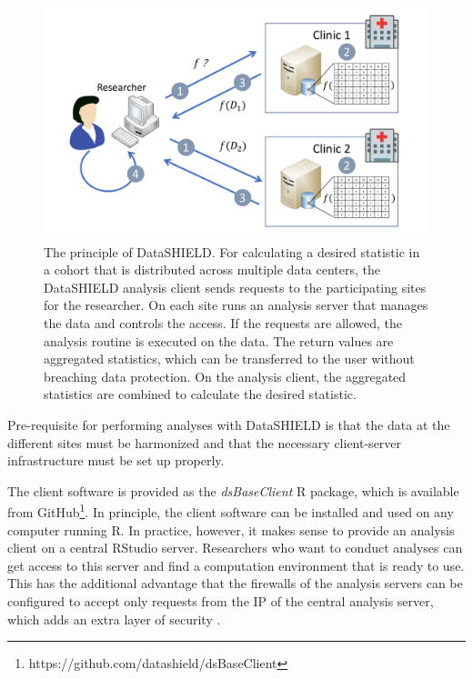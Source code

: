 \documentclass[12pt]{article}
\newcommand{\apkg}[1]{\emph{#1}}
\newcommand{\circlenum}[1]{\raisebox{.5pt}{\textcircled{\raisebox{-.9pt} {#1}}}}
\begin{document}
 \begin{figure}[h]
   \centering
   \includegraphics[scale=0.6]{images/datashieldprinciple.pdf}
   \caption{The principle of DataSHIELD. For calculating a desired statistic in a cohort that is distributed across multiple data centers, the DataSHIELD analysis client sends requests \circlenum{1} to the participating sites for the researcher. \circlenum{2} On each site runs an analysis server that manages the data and controls the access. If the requests are allowed, the analysis routine is executed on the data. \circlenum{3} The return values are aggregated statistics, which can be transferred to the user without breaching data protection. \circlenum{4} On the analysis client, the aggregated statistics are combined to calculate the desired statistic.}
   \label{fig:datashieldprinciple}
 \end{figure}

Pre-requisite for performing analyses with DataSHIELD is that the data at the different sites must be harmonized and that the necessary client-server infrastructure must be set up properly.

The client software is provided as the \apkg{dsBaseClient} R package, which is available from GitHub\footnote{https://github.com/datashield/dsBaseClient}.
In principle, the client software can be installed and used on any computer running R.
In practice, however, it makes sense to provide an analysis client on a central RStudio server.
Researchers who want to conduct analyses can get access to this server and find a computation environment that is ready to use.
This has the additional advantage that the firewalls of the analysis servers can be configured to accept only requests from the IP of the central analysis server, which adds an extra layer of security \citep{gruendner}.
\end{document}
